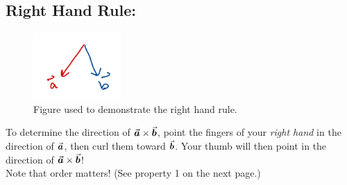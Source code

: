  

%

\vspace*{.1in}
\subsection*{Right Hand Rule:}



\begin{figure}[!h]
\centering
\includegraphics[height=1in]{Ch2s4-right-hand-rule.png}
\caption{Figure used to demonstrate the right hand rule.}
\end{figure}

\hspace*{.2in}

To determine the direction of \(\a \times \b\), point the fingers of your \textit{right hand} in the direction of \(\a\), then curl them toward \(\b\). Your thumb will then point in the direction of \(\a \times \b\)!\\

Note that order matters! (See property 1 on the next page.)\\


%
%
%

